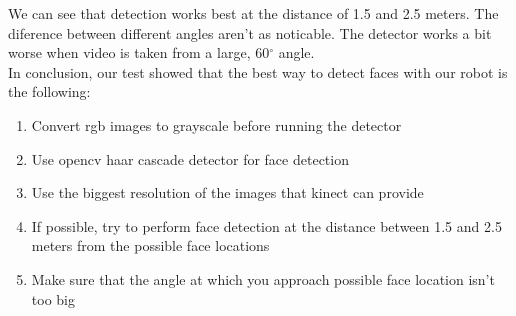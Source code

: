 \documentclass[12pt,a4paper]{report}
\begin{document}
	We can see that detection works best at the distance of 1.5 and 2.5 meters. The diference between different angles aren't as noticable. The detector works a bit worse when video is taken from a large, 60$^{\circ}$ angle. \\
	
	In conclusion, our test showed that the best way to detect faces with our robot is the following:
	\begin{enumerate}
		\item Convert rgb images to grayscale before running the detector
		\item Use opencv haar cascade detector for face detection
		\item Use the biggest resolution of the images that kinect can provide
		\item If possible, try to perform face detection at the distance between 1.5 and 2.5 meters from the possible face locations
		\item Make sure that the angle at which you approach possible face location isn't too big
	\end{enumerate}	
	
\end{document}
